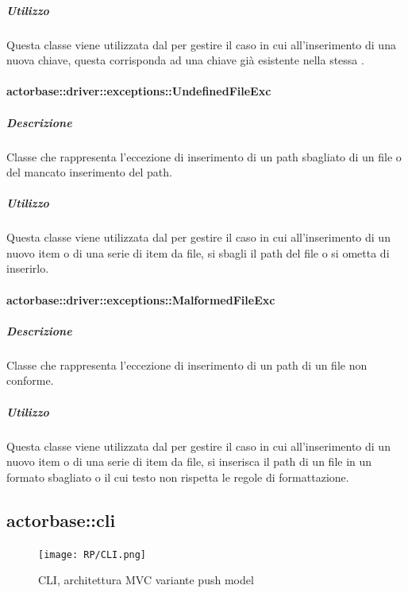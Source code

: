 \documentclass{scalatekids-article}
\begin{document}
\subparagraph{Utilizzo}

Questa classe viene utilizzata dal  per gestire il caso in cui all'inserimento di una nuova chiave, questa corrisponda ad una chiave già esistente nella stessa .

\paragraph{actorbase::driver::exceptions::UndefinedFileExc}

\subparagraph{Descrizione}

Classe che rappresenta l'eccezione di inserimento di un path sbagliato di un file o del mancato inserimento del path.

\subparagraph{Utilizzo}

Questa classe viene utilizzata dal  per gestire il caso in cui all'inserimento di un nuovo item o di una serie di item da file, si sbagli il path del file o si ometta di inserirlo.

\paragraph{actorbase::driver::exceptions::MalformedFileExc}

\subparagraph{Descrizione}

Classe che rappresenta l'eccezione di inserimento di un path di un file non conforme.

\subparagraph{Utilizzo}

Questa classe viene utilizzata dal  per gestire il caso in cui all'inserimento di un nuovo item o di una serie di item da file, si inserisca il path di un file in un formato sbagliato o il cui testo non rispetta le regole di formattazione.



\subsection{actorbase::cli}
\label{sec:actorbase::cli}

\begin{figure}[H]
  \begin{center}
    \texttt{[image: RP/CLI.png]}
    \caption{CLI, architettura MVC variante push model}
  \end{center}
\end{figure}
\end{document}
